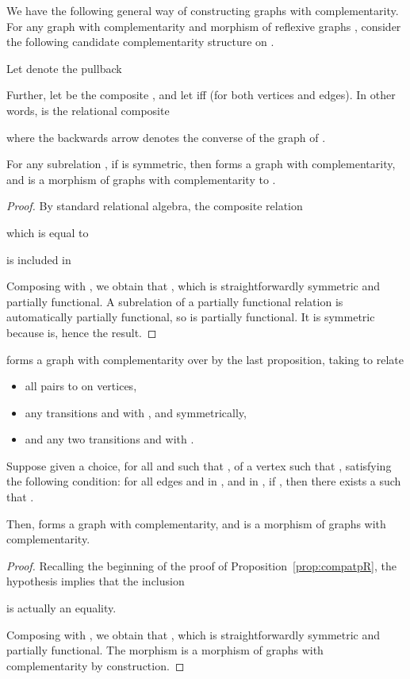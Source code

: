 \documentclass{LMCS}
\theoremstyle{plain}\newtheorem{satz}[thm]{Satz}
\begin{document}
We have the following general way of constructing graphs with
complementarity.  For any graph with complementarity  and morphism
of reflexive graphs , consider the following
candidate complementarity structure on . 

  Let  denote the pullback
  
Further, let  be the composite , and let  iff  (for both vertices and edges). In other words,
   is the relational composite 
    
    where the backwards  arrow denotes the converse of the graph
    of .

    \begin{prop}\label{prop:compatpR}
      For any subrelation , if 
      is symmetric, then  forms a graph
      with complementarity, and  is a morphism of graphs with
      complementarity to .
    \end{prop}
    \begin{proof}
    By standard relational algebra, the composite relation
    
    which is equal to
    
    is included in
    

    Composing with , we obtain that , which is
    straightforwardly symmetric and partially functional.  A
    subrelation of a partially functional relation is automatically
    partially functional, so  is partially functional.
    It is symmetric because  is, hence the result.
    \end{proof}

\begin{exa}\label{ex:lgraphs}
   forms a graph with complementarity over  by the last
  proposition, taking  to relate
  \begin{itemize}
  \item all pairs  to 
    on vertices,
  \item any transitions  and  with
    , and symmetrically,
  \item and any two transitions  and  with .
  \end{itemize}
\end{exa}

    \begin{prop}\label{prop:constructcompl} Suppose given a choice, for all  and  such that , of a vertex  such that , satisfying the following
      condition: for all edges  and  in , and  in , if
      , then there exists a
       such that
      .

      Then,  forms a graph with
      complementarity, and  is a morphism of graphs with
      complementarity.
  \end{prop}
  \begin{proof}
    Recalling the beginning of the proof of Proposition~\ref{prop:compatpR},
    the hypothesis implies that the inclusion
    
    is actually an equality.
    
    Composing with , we obtain that , which is straightforwardly
    symmetric and partially functional. The morphism  is a morphism
    of graphs with complementarity by construction.
\end{proof}
\end{document}
